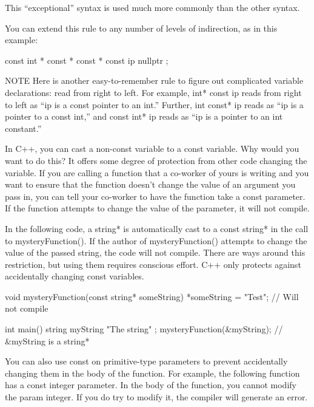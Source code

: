 This “exceptional” syntax is used much more commonly than the other syntax.

You can extend this rule to any number of levels of indirection, as in this example:

\begin{cpp}
const int * const * const * const ip { nullptr };
\end{cpp}

\begin{myNotic}{NOTE}
Here is another easy-to-remember rule to figure out complicated variable declarations: read from right to left. For example, int* const ip reads from right to left as “ip is a const pointer to an int.” Further, int const* ip reads as “ip is a pointer to a const int,” and const int* ip reads as “ip is a pointer to an int constant.”
\end{myNotic}


In C++, you can cast a non-const variable to a const variable. Why would you want to do this? It offers some degree of protection from other code changing the variable. If you are calling a function that a co-worker of yours is writing and you want to ensure that the function doesn’t change the value of an argument you pass in, you can tell your co-worker to have the function take a const parameter. If the function attempts to change the value of the parameter, it will not compile.

In the following code, a string* is automatically cast to a const string* in the call to mysteryFunction(). If the author of mysteryFunction() attempts to change the value of the passed string, the code will not compile. There are ways around this restriction, but using them requires conscious effort. C++ only protects against accidentally changing const variables.

\begin{cpp}
void mysteryFunction(const string* someString)
{
    *someString = "Test"; // Will not compile
}

int main()
{
    string myString { "The string" };
    mysteryFunction(&myString); // &myString is a string*
}
\end{cpp}

You can also use const on primitive-type parameters to prevent accidentally changing them in the body of the function. For example, the following function has a const integer parameter. In the body of the function, you cannot modify the param integer. If you do try to modify it, the compiler will generate an error.

